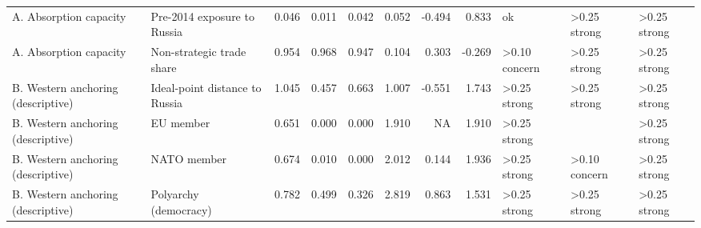 \begin{table}
\begin{tabular}[t]{llrrrrrrlll}
A. Absorption capacity & Pre-2014 exposure to Russia & 0.046 & 0.011 & 0.042 & 0.052 & -0.494 & 0.833 & ok & >0.25 strong & >0.25 strong\\
A. Absorption capacity & Non-strategic trade share & 0.954 & 0.968 & 0.947 & 0.104 & 0.303 & -0.269 & >0.10 concern & >0.25 strong & >0.25 strong\\
B. Western anchoring (descriptive) & Ideal-point distance to Russia & 1.045 & 0.457 & 0.663 & 1.007 & -0.551 & 1.743 & >0.25 strong & >0.25 strong & >0.25 strong\\
B. Western anchoring (descriptive) & EU member & 0.651 & 0.000 & 0.000 & 1.910 & NA & 1.910 & >0.25 strong &  & >0.25 strong\\
B. Western anchoring (descriptive) & NATO member & 0.674 & 0.010 & 0.000 & 2.012 & 0.144 & 1.936 & >0.25 strong & >0.10 concern & >0.25 strong\\
B. Western anchoring (descriptive) & Polyarchy (democracy) & 0.782 & 0.499 & 0.326 & 2.819 & 0.863 & 1.531 & >0.25 strong & >0.25 strong & >0.25 strong\\
\bottomrule
\end{tabular}
\end{table}
